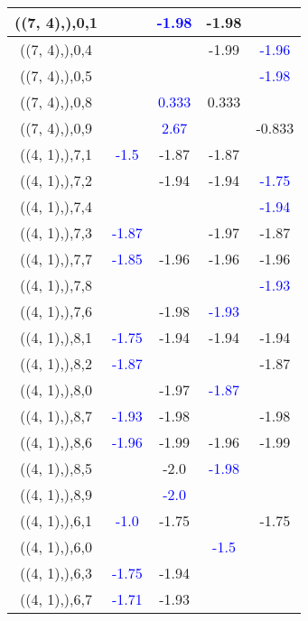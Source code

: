 \documentclass{article}
\begin{document}
\begin{center}
\begin{longtable}{|c|c|c|c|c|}
        	\hline
        	((7, 4),),0,1&& \textcolor{blue}{-1.98}&-1.98&\\
        	\hline
        	((7, 4),),0,4&&&-1.99& \textcolor{blue}{-1.96}\\
        	\hline
        	((7, 4),),0,5&&&& \textcolor{blue}{-1.98}\\
        	\hline
        	((7, 4),),0,8&& \textcolor{blue}{0.333}&0.333&\\
        	\hline
        	((7, 4),),0,9&& \textcolor{blue}{2.67}&&-0.833\\
        	\hline
        	((4, 1),),7,1& \textcolor{blue}{-1.5}&-1.87&-1.87&\\
        	\hline
        	((4, 1),),7,2&&-1.94&-1.94& \textcolor{blue}{-1.75}\\
        	\hline
        	((4, 1),),7,4&&&& \textcolor{blue}{-1.94}\\
        	\hline
        	((4, 1),),7,3& \textcolor{blue}{-1.87}&&-1.97&-1.87\\
        	\hline
        	((4, 1),),7,7& \textcolor{blue}{-1.85}&-1.96&-1.96&-1.96\\
        	\hline
        	((4, 1),),7,8&&&& \textcolor{blue}{-1.93}\\
        	\hline
        	((4, 1),),7,6&&-1.98& \textcolor{blue}{-1.93}&\\
        	\hline
        	((4, 1),),8,1& \textcolor{blue}{-1.75}&-1.94&-1.94&-1.94\\
        	\hline
        	((4, 1),),8,2& \textcolor{blue}{-1.87}&&&-1.87\\
        	\hline
        	((4, 1),),8,0&&-1.97& \textcolor{blue}{-1.87}&\\
        	\hline
        	((4, 1),),8,7& \textcolor{blue}{-1.93}&-1.98&&-1.98\\
        	\hline
        	((4, 1),),8,6& \textcolor{blue}{-1.96}&-1.99&-1.96&-1.99\\
        	\hline
        	((4, 1),),8,5&&-2.0& \textcolor{blue}{-1.98}&\\
        	\hline
        	((4, 1),),8,9&& \textcolor{blue}{-2.0}&&\\
        	\hline
        	((4, 1),),6,1& \textcolor{blue}{-1.0}&-1.75&&-1.75\\
        	\hline
        	((4, 1),),6,0&&& \textcolor{blue}{-1.5}&\\
        	\hline
        	((4, 1),),6,3& \textcolor{blue}{-1.75}&-1.94&&\\
        	\hline
        	((4, 1),),6,7& \textcolor{blue}{-1.71}&-1.93&&\\

\end{longtable}
\end{center}
\end{document}

